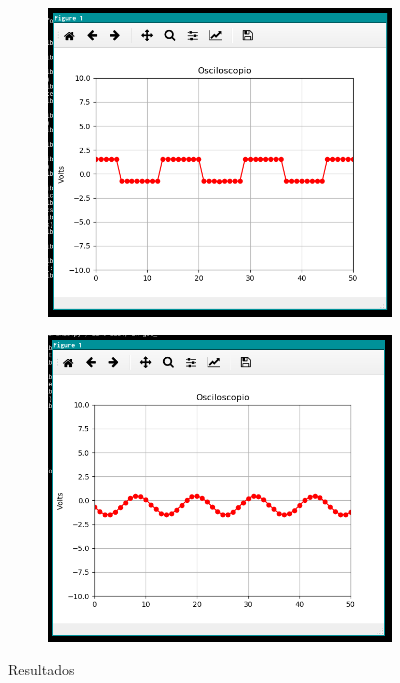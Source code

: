 \documentclass{article}
\begin{document}
\begin{figure}[h]
\begin{subfigure}{0.5\textwidth}
\centering
\includegraphics[scale=0.2]{Osc1.png}
\end{subfigure}
\begin{subfigure}{0.5\textwidth}
\centering
\includegraphics[scale=0.2]{Osc2.png}
\end{subfigure}
\caption{Resultados}
\label{Fig:Res}
\end{figure}
\end{document}
